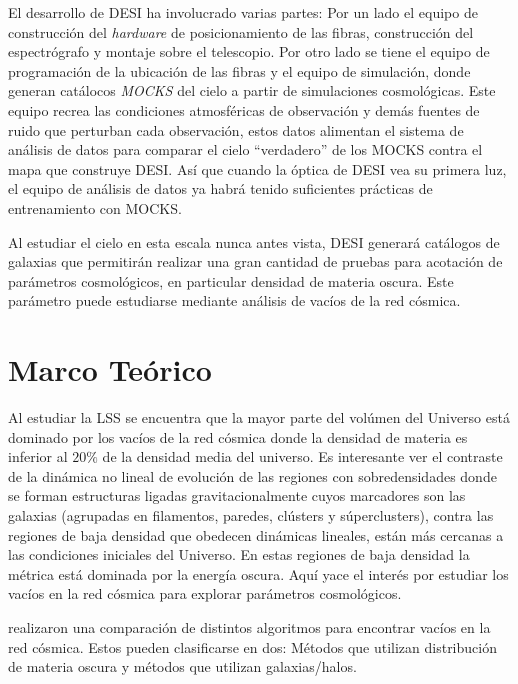 \documentclass[preprint]{aastex62}
\begin{document}
  El desarrollo de DESI ha involucrado varias partes: Por un lado el equipo de construcción
  del \textit{hardware} de posicionamiento de las fibras, construcción del espectrógrafo y
  montaje sobre el telescopio. Por otro lado se tiene el equipo de programación de la ubicación
  de las fibras y el equipo de simulación, donde generan catálocos \textit{MOCKS} del cielo a
  partir de simulaciones cosmológicas. Este equipo recrea las condiciones atmosféricas de observación
  y demás fuentes de ruido que perturban cada observación, estos datos alimentan el sistema
  de análisis de datos para comparar el cielo ``verdadero'' de los MOCKS contra el mapa que
  construye DESI. Así que cuando la óptica de DESI vea su primera luz, el equipo de análisis
  de datos ya habrá tenido suficientes prácticas de entrenamiento con MOCKS.

  Al estudiar el cielo en esta escala nunca antes vista, DESI generará catálogos de galaxias
  que permitirán realizar una gran cantidad de pruebas para acotación de parámetros cosmológicos,
  en particular densidad de materia oscura. Este parámetro puede estudiarse mediante análisis
  de vacíos de la red cósmica.


  \section{Marco Teórico}

  Al estudiar la LSS se encuentra que la mayor parte del volúmen del Universo está dominado
  por los vacíos de la red cósmica donde la densidad de materia es inferior al $20\%$ de la
  densidad media del universo. Es interesante ver el contraste de la dinámica no lineal de evolución de
  las regiones con sobredensidades donde se forman estructuras ligadas gravitacionalmente
  cuyos marcadores son las galaxias (agrupadas en filamentos, paredes, clústers y súperclusters),
  contra las regiones de baja densidad que obedecen dinámicas lineales, están más cercanas a
  las condiciones iniciales del Universo. En estas regiones de baja densidad la métrica está
  dominada por la energía oscura. Aquí yace el interés por estudiar los vacíos en la
  red cósmica para explorar parámetros cosmológicos.

  
  \citet{Aspen-Amsterdam2008} realizaron una comparación de distintos algoritmos para encontrar vacíos
  en la red cósmica. Estos pueden clasificarse en dos: Métodos que utilizan distribución de materia
  oscura y métodos que utilizan galaxias/halos.
\end{document}
